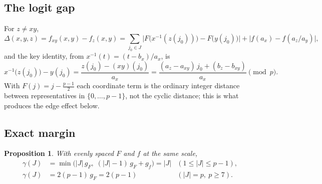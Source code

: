 \documentclass[11pt]{article}
\newtheorem{proposition}{Proposition}
\theoremstyle{remark}
\newcommand{\gam}{\gamma}
\newcommand{\abs}[1]{\lvert #1 \rvert}
\begin{document}
\subsection{The logit gap}

For $z \ne xy$,
\begin{equation}\label{eq:gap}
\Delta(x,y,z) = f_{xy}(x,y) - f_z(x,y) = \sum_{j_0 \in J} \abs{F\bigl(x^{-1}(z(j_0))\bigr) - F\bigl(y(j_0)\bigr)}
 + \abs{f(a_x) - f(a_z / a_y)},
\end{equation}
and the key identity, from $x^{-1}(t) = (t - b_x)/a_x$, is
\begin{equation}\label{eq:shift}
x^{-1}\bigl(z(j_0)\bigr) - y(j_0) = \frac{z(j_0) - (xy)(j_0)}{a_x} = \frac{(a_z - a_{xy})\, j_0 + (b_z - b_{xy})}{a_x} \pmod p .
\end{equation}
With $F(j) = j - \tfrac{p-1}{2}$ each coordinate term is the ordinary integer distance between representatives in
$\{0, \dots, p-1\}$, not the cyclic distance; this is what produces the edge effect below.

\subsection{Exact margin}

\begin{proposition}\label{prop:plain}
With evenly spaced $F$ and $f$ at the same scale,
\begin{align*}
\gam(J) &= \min\bigl(\abs{J}\, g_F,\; (\abs{J}-1)\, g_F + g_f\bigr) = \abs{J} & (1 \le \abs{J} \le p-1), \\
\gam(J) &= 2(p-1)\, g_F = 2(p-1) & (\abs{J} = p,\ p \ge 7).
\end{align*}
\end{proposition}
\end{document}
